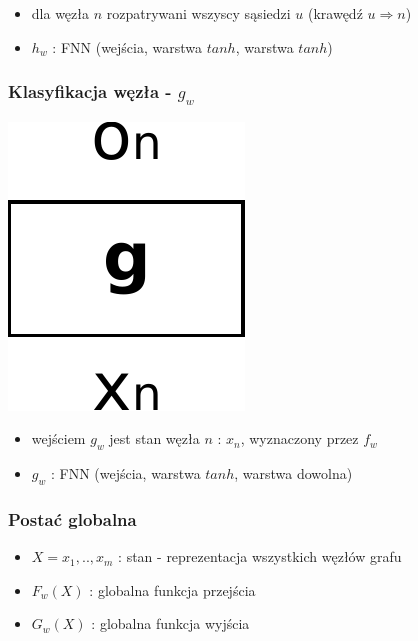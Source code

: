 \documentclass{beamer}
\begin{document}
\begin{frame}
\begin{columns}
\begin{column}{0.8\textwidth}
\begin{center}
		\end{center}
	\end{column}
\end{columns}
\medskip
\begin{itemize}
	\item dla węzła $n$ rozpatrywani wszyscy sąsiedzi $u$ (krawędź $u \Rightarrow n$)
	\item $h_w$ : FNN (wejścia, warstwa $tanh$, warstwa $tanh$)
\end{itemize}
\end{frame}

\begin{frame}
\frametitle{Klasyfikacja węzła - $g_w$}
\begin{center}
\includegraphics[scale=0.4]{img/g}
\end{center}
\begin{itemize}
	\item wejściem $g_w$ jest stan węzła $n$ : $x_n$, wyznaczony przez $f_w$
	\item $g_w$ : FNN (wejścia, warstwa $tanh$, warstwa dowolna)
\end{itemize}
\end{frame}

\begin{frame}
\frametitle{Postać globalna}
\begin{itemize}
	\item $X = {x_1, .., x_m}$ : stan - reprezentacja wszystkich węzłów grafu
	\item $F_w(X)$ : globalna funkcja przejścia
	\item $G_w(X)$ : globalna funkcja wyjścia
\end{itemize}
\end{frame}
\end{document}
